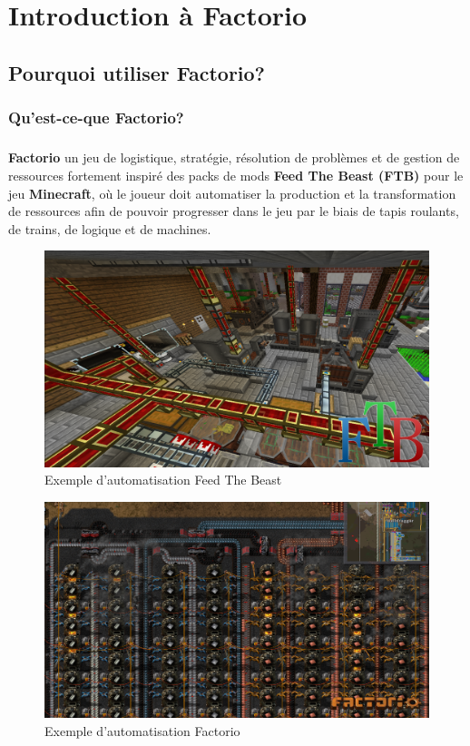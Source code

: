 \chapter{Introduction à Factorio}
\section{Pourquoi utiliser Factorio?}
	
\subsection{Qu'est-ce-que Factorio?} 

\paragraph{}

\textbf{Factorio} un jeu de logistique, stratégie, résolution de problèmes et de gestion de ressources fortement inspiré des packs de mods \textbf{Feed The Beast (FTB)} pour le jeu \textbf{Minecraft}, où le joueur doit automatiser la production et la transformation de ressources afin de pouvoir progresser dans le jeu par le biais de tapis roulants, de trains, de logique et de machines.

\begin{figure}[h]
\centering
\includegraphics[width=0.8\linewidth]{pics/ftb-presentation.png}

\caption{Exemple d'automatisation Feed The Beast}
\end{figure}

\begin{figure}[h]
\centering
\includegraphics[width=0.8\linewidth]{pics/factorio-presentation.png}

\caption{Exemple d'automatisation Factorio}
\end{figure}


